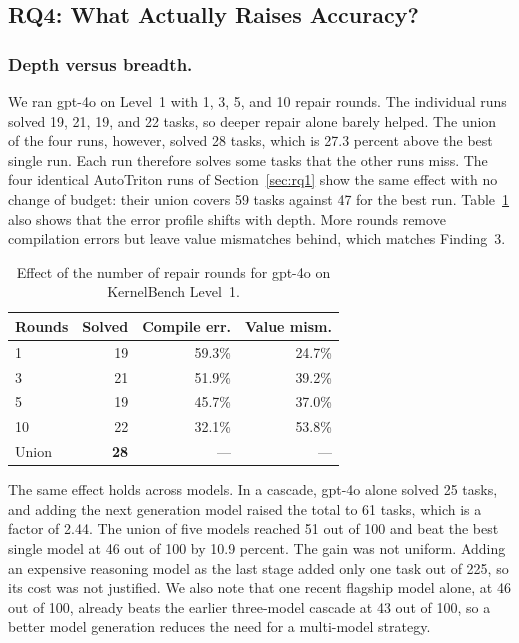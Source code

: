 \documentclass[11pt]{article}
\newcommand{\headrow}[1]{\textbf{#1}}
\begin{document}
\subsection{RQ4: What Actually Raises Accuracy?}\label{sec:rq4}

\subsubsection{Depth versus breadth.}
We ran gpt-4o on Level~1 with 1, 3, 5, and 10 repair rounds. The individual runs solved 19, 21, 19,
and 22 tasks, so deeper repair alone barely helped. The union of the four runs, however, solved 28
tasks, which is 27.3 percent above the best single run. Each run therefore solves some tasks that
the other runs miss. The four identical AutoTriton runs of Section~\ref{sec:rq1} show the same
effect with no change of budget: their union covers 59 tasks against 47 for the best run. Table~\ref{tab:rq4a} also shows that the error profile shifts with depth. More
rounds remove compilation errors but leave value mismatches behind, which matches Finding~3.

\begin{table}[t]
\centering
\small
\setlength{\tabcolsep}{5pt}
\caption{Effect of the number of repair rounds for gpt-4o on KernelBench Level~1.}
\label{tab:rq4a}
\begin{tabular}{@{}lrrr@{}}
\toprule
\headrow{Rounds} & \headrow{Solved} & \headrow{Compile err.} & \headrow{Value mism.} \\
\midrule
1  & 19 & 59.3\% & 24.7\% \\
3  & 21 & 51.9\% & 39.2\% \\
5  & 19 & 45.7\% & 37.0\% \\
10 & 22 & 32.1\% & 53.8\% \\
\midrule
Union & \textbf{28} & --- & --- \\
\bottomrule
\end{tabular}
\end{table}

The same effect holds across models. In a cascade, gpt-4o alone solved 25 tasks, and adding the next
generation model raised the total to 61 tasks, which is a factor of 2.44. The union of five models
reached 51 out of 100 and beat the best single model at 46 out of 100 by 10.9 percent. The gain was
not uniform. Adding an expensive reasoning model as the last stage added only one task out of 225,
so its cost was not justified. We also note that one recent flagship model alone, at 46 out of 100,
already beats the earlier three-model cascade at 43 out of 100, so a better model generation reduces
the need for a multi-model strategy.
\end{document}
